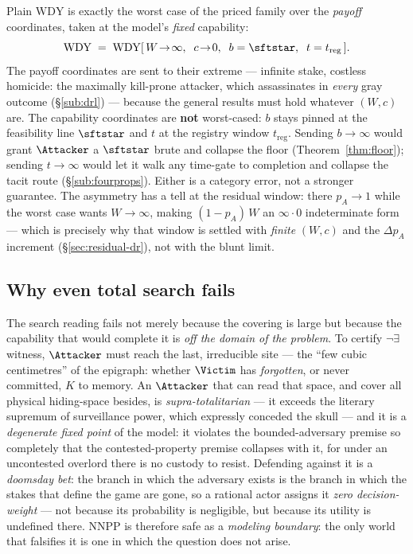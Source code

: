 \begin{remark}\label{rem:worstcase}
Plain $\mathrm{WDY}$ is exactly the worst case of the priced family over the
\emph{payoff} coordinates, taken at the model's \emph{fixed} capability:
\[
  \mathrm{WDY} \;=\; \mathrm{WDY}[\,W\!\to\!\infty,\;\; c\!\to\!0,\;\; b = \sftstar,\;\; t = t_{\mathrm{reg}}\,].
\]
The payoff coordinates are sent to their extreme --- infinite stake, costless
homicide: the maximally kill-prone attacker, which assassinates in \emph{every}
gray outcome (\S\ref{sub:drl}) --- because the general results must hold whatever
$(W,c)$ are. The capability coordinates are \textbf{not} worst-cased: $b$ stays
pinned at the feasibility line $\sftstar$ and $t$ at the registry window
$t_{\mathrm{reg}}$. Sending $b \to \infty$ would grant $\Attacker$ a $\sftstar$
brute and collapse the floor (Theorem~\ref{thm:floor}); sending $t \to \infty$
would let it walk any time-gate to completion and collapse the tacit route
(\S\ref{sub:fourprops}). Either is a category error, not a stronger guarantee. The asymmetry has a tell at the residual
window: there $p_A \to 1$ while the worst case wants $W \to \infty$, making
$(1-p_A)\,W$ an $\infty\cdot 0$ indeterminate form --- which is precisely why that
window is settled with \emph{finite} $(W,c)$ and the $\Delta p_A$ increment
(\S\ref{sec:residual-dr}), not with the blunt limit.
\end{remark}

\subsection{Why even total search fails}
\label{app:chain-nnpp}

\begin{remark}\label{rem:selfdefeat}
The search reading fails not merely because the covering is large but because the
capability that would complete it is \emph{off the domain of the problem}. To
certify $\neg\exists$ witness, $\Attacker$ must reach the last, irreducible site
--- the ``few cubic centimetres'' of the epigraph: whether $\Victim$ has
\emph{forgotten}, or never committed, $K$ to memory. An $\Attacker$ that can read
that space, and cover all physical hiding-space besides, is
\emph{supra-totalitarian} --- it exceeds the literary supremum of surveillance
power, which expressly conceded the skull --- and it is a \emph{degenerate fixed
point} of the model: it violates the bounded-adversary premise so completely that
the contested-property premise collapses with it, for under an uncontested
overlord there is no custody to resist. Defending against it is a \emph{doomsday
bet}: the branch in which the adversary exists is the branch in which the stakes
that define the game are gone, so a rational actor assigns it \emph{zero
decision-weight} --- not because its probability is negligible, but because its
utility is undefined there. NNPP is therefore safe as a \emph{modeling boundary}:
the only world that falsifies it is one in which the question does not arise.
\end{remark}

